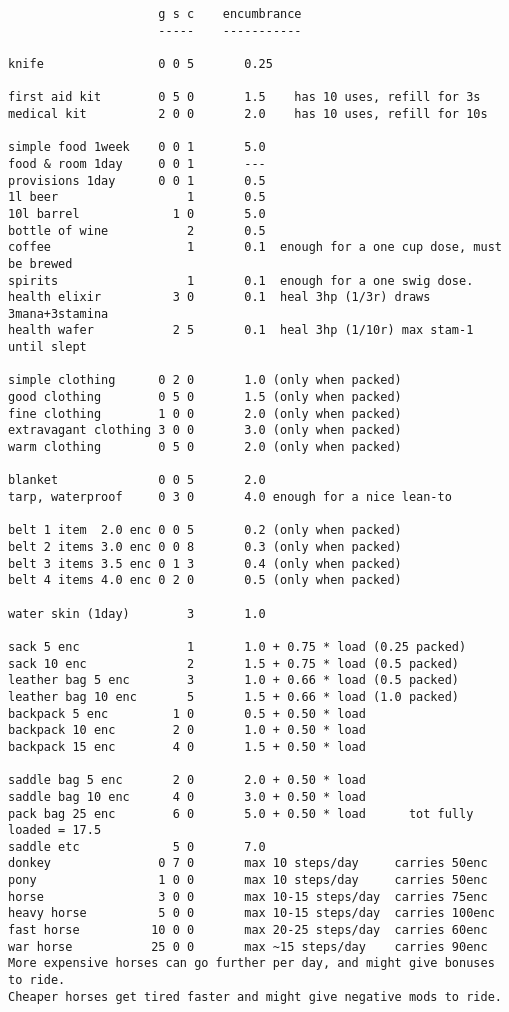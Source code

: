 \small
\pagebreak[1] \begin{verbatim}
                     g s c    encumbrance
                     -----    -----------

knife                0 0 5       0.25

first aid kit        0 5 0       1.5    has 10 uses, refill for 3s
medical kit          2 0 0       2.0    has 10 uses, refill for 10s

simple food 1week    0 0 1       5.0
food & room 1day     0 0 1       ---
provisions 1day      0 0 1       0.5
1l beer                  1       0.5
10l barrel             1 0       5.0
bottle of wine           2       0.5
coffee                   1       0.1  enough for a one cup dose, must be brewed
spirits                  1       0.1  enough for a one swig dose.
health elixir          3 0       0.1  heal 3hp (1/3r) draws 3mana+3stamina
health wafer           2 5       0.1  heal 3hp (1/10r) max stam-1 until slept

simple clothing      0 2 0       1.0 (only when packed)
good clothing        0 5 0       1.5 (only when packed)
fine clothing        1 0 0       2.0 (only when packed)
extravagant clothing 3 0 0       3.0 (only when packed)
warm clothing        0 5 0       2.0 (only when packed)

blanket              0 0 5       2.0
tarp, waterproof     0 3 0       4.0 enough for a nice lean-to

belt 1 item  2.0 enc 0 0 5       0.2 (only when packed)
belt 2 items 3.0 enc 0 0 8       0.3 (only when packed)
belt 3 items 3.5 enc 0 1 3       0.4 (only when packed)
belt 4 items 4.0 enc 0 2 0       0.5 (only when packed)

water skin (1day)        3       1.0

sack 5 enc               1       1.0 + 0.75 * load (0.25 packed)
sack 10 enc              2       1.5 + 0.75 * load (0.5 packed)
leather bag 5 enc        3       1.0 + 0.66 * load (0.5 packed)
leather bag 10 enc       5       1.5 + 0.66 * load (1.0 packed)
backpack 5 enc         1 0       0.5 + 0.50 * load
backpack 10 enc        2 0       1.0 + 0.50 * load
backpack 15 enc        4 0       1.5 + 0.50 * load

saddle bag 5 enc       2 0       2.0 + 0.50 * load
saddle bag 10 enc      4 0       3.0 + 0.50 * load
pack bag 25 enc        6 0       5.0 + 0.50 * load      tot fully loaded = 17.5
saddle etc             5 0       7.0
donkey               0 7 0       max 10 steps/day     carries 50enc
pony                 1 0 0       max 10 steps/day     carries 50enc
horse                3 0 0       max 10-15 steps/day  carries 75enc
heavy horse          5 0 0       max 10-15 steps/day  carries 100enc
fast horse          10 0 0       max 20-25 steps/day  carries 60enc
war horse           25 0 0       max ~15 steps/day    carries 90enc
More expensive horses can go further per day, and might give bonuses to ride.
Cheaper horses get tired faster and might give negative mods to ride.


\end{verbatim}
